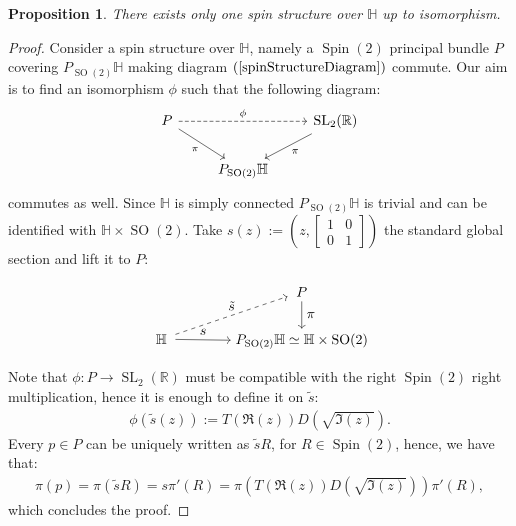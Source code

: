 \documentclass[12pt]{amsart}
\newtheorem{proposition}{Proposition}%
\theoremstyle{definition}
\def\RR{{\mathbb R}}
\def\HH{{\mathbb{H}}}
\newcommand{\slinear}{\operatorname{SL}}
\newcommand{\so}{\operatorname{SO}}
\newcommand{\spin}{\operatorname{Spin}}
\begin{document}
\begin{proposition}\label{oneSpinStructure}
There exists only one spin structure over $\HH$ up to isomorphism.
\end{proposition}
\begin{proof}
Consider a spin structure over $\HH$, namely a $\spin(2)$ principal bundle $P$ covering $P_{\so(2)}\HH$ making diagram $(\ref{spinStructureDiagram})$ commute. Our aim is to find an isomorphism $\phi$ such that the following diagram:
\begin{equation}\label{diagramPiPhi}
\begin{tikzcd}
P \arrow{dr}[swap]{\pi} \arrow[dashed]{rr}{\phi} && \slinear_2(\RR) \arrow{dl}{\pi} \\
& P_{\so(2)}\HH
\end{tikzcd}
\end{equation}
commutes as well. Since $\HH$ is simply connected $P_{\so(2)}\HH$ is trivial and can be identified with $\HH\times \so(2)$. Take $s(z):=\left( z,\begin{bmatrix}
1 & 0 \\
0 & 1
\end{bmatrix} \right)$ the standard global section and lift it to $P$:
\begin{equation*}
\begin{tikzpicture}[baseline=(current  bounding  box.center)]
  \matrix (m) [matrix of math nodes,row sep=2em,column sep=4em,minimum width=2em]
  {
      {} & P \\
      \HH & P_{\so(2)}\HH \simeq \HH\times \so(2) \\
  };
  \path[->]
    (m-2-1) edge node [ above] {$s$} (m-2-2)
    (m-1-2) edge node [right] {$\pi$} (m-2-2)
    (m-2-1)	edge [dashed] node [above] {$\tilde{s}$} (m-1-2);
\end{tikzpicture}
\end{equation*}
Note that $\phi : P \longrightarrow \slinear_2(\RR)$ must be compatible with the right $\spin(2)$ right multiplication, hence it is enough to define it on $\tilde{s}$:
\begin{align*}
\phi(\tilde{s}(z)) := T(\Re(z))D(\sqrt{\Im(z)}).
\end{align*}
Every $p\in P$ can be uniquely written as $\tilde{s} R$, for $R\in \spin(2)$, hence, we have that:
\begin{align*}
\pi(p) = \pi(\tilde{s}R) = s\pi'(R) = \pi\left( T(\Re(z))D(\sqrt{\Im(z)})\right) \pi'(R),
\end{align*}
which concludes the proof.
\end{proof}
\end{document}
